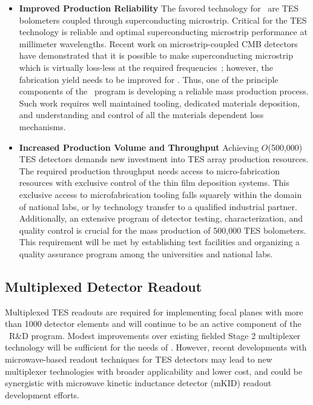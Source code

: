 \begin{itemize}

\item {\bf Improved Production Reliability} The favored technology for
  \cmbexp\ are TES bolometers coupled through superconducting
  microstrip. Critical for the TES technology is reliable and optimal
  superconducting microstrip performance at millimeter
  wavelengths. Recent work on microstrip-coupled CMB detectors have
  demonstrated that it is possible to make superconducting microstrip
  which is virtually loss-less at the required
  frequencies~\cite{sptpol150}; however, the fabrication yield needs
  to be improved for \cmbexp. Thus, one of the principle components of
  the \cmbexp\ program is developing a reliable mass production
  process. Such work requires well maintained tooling, dedicated
  materials deposition, and understanding and control of all the
  materials dependent loss mechanisms.


\item {\bf Increased Production Volume and Throughput} Achieving
  $O$(500,000) TES detectors demands new investment into TES array
  production resources. The required production throughput needs
  access to micro-fabrication resources with exclusive control of the
  thin film deposition systems. This exclusive access to
  microfabrication tooling falls squarely within the domain of
  national labs, or by technology transfer to a qualified industrial partner. Additionally, an extensive program of detector
  testing, characterization, and quality control is crucial for the
  mass production of 500,000 TES bolometers. This requirement will be
  met by establishing test facilities and organizing a quality
  assurance program among the universities and national labs.

\end{itemize}



\subsection{Multiplexed Detector Readout}

 Multiplexed TES readouts are
  required for implementing focal planes with more than 1000 detector
  elements and will continue to be an active component of the
  \cmbexp\ R\&D program. Modest improvements over existing fielded
  Stage 2 multiplexer technology will be sufficient for the needs of
  \cmbexp. However, recent developments with microwave-based readout
  techniques for TES detectors may lead to new multiplexer technologies
  with broader applicability and lower cost, and could be synergistic
  with microwave kinetic inductance detector (mKID) readout development efforts.   


